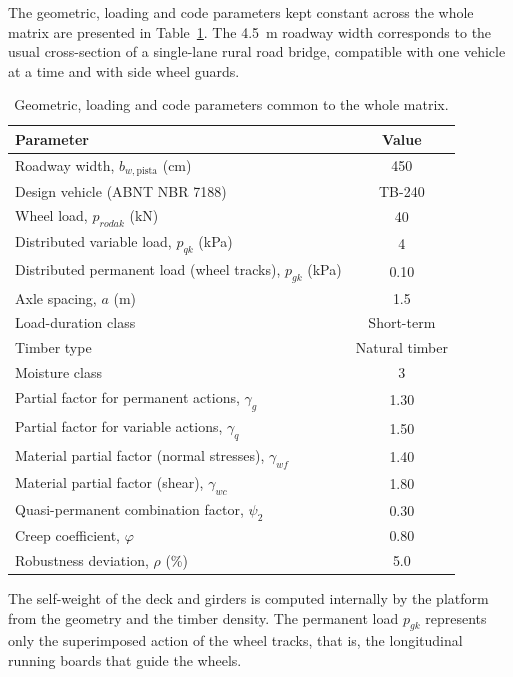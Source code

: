 The geometric, loading and code parameters kept constant across the whole matrix are presented in Table~\ref{tab:parametros}.
The 4.5~m roadway width corresponds to the usual cross-section of a single-lane rural road bridge, compatible with one vehicle at a time and with side wheel guards.

\begin{table}[!ht]
\caption{Geometric, loading and code parameters common to the whole matrix.\label{tab:parametros}}
\begin{threeparttable}
\begin{tabular*}{\columnwidth}{@{\extracolsep\fill}lc@{\extracolsep\fill}}
\toprule
Parameter & Value \\
\midrule
Roadway width, $b_{w,\mathrm{pista}}$ (cm) & 450 \\
Design vehicle (ABNT NBR 7188) & TB-240 \\
Wheel load, $p_{rodak}$ (kN) & 40 \\
Distributed variable load, $p_{qk}$ (kPa) & 4 \\
Distributed permanent load (wheel tracks), $p_{gk}$ (kPa)\tnote{a} & 0.10 \\
Axle spacing, $a$ (m) & 1.5 \\
Load-duration class & Short-term \\
Timber type & Natural timber \\
Moisture class & 3 \\
Partial factor for permanent actions, $\gamma_g$ & 1.30 \\
Partial factor for variable actions, $\gamma_q$ & 1.50 \\
Material partial factor (normal stresses), $\gamma_{wf}$ & 1.40 \\
Material partial factor (shear), $\gamma_{wc}$ & 1.80 \\
Quasi-permanent combination factor, $\psi_2$ & 0.30 \\
Creep coefficient, $\varphi$ & 0.80 \\
Robustness deviation, $\rho$ (\%) & 5.0 \\
\bottomrule
\end{tabular*}
\begin{tablenotes}
\footnotesize
\item[a] The self-weight of the deck and girders is computed internally by the platform from the geometry and the timber density. The permanent load $p_{gk}$ represents only the superimposed action of the wheel tracks, that is, the longitudinal running boards that guide the wheels.

\end{tablenotes}
\end{threeparttable}
\end{table}

